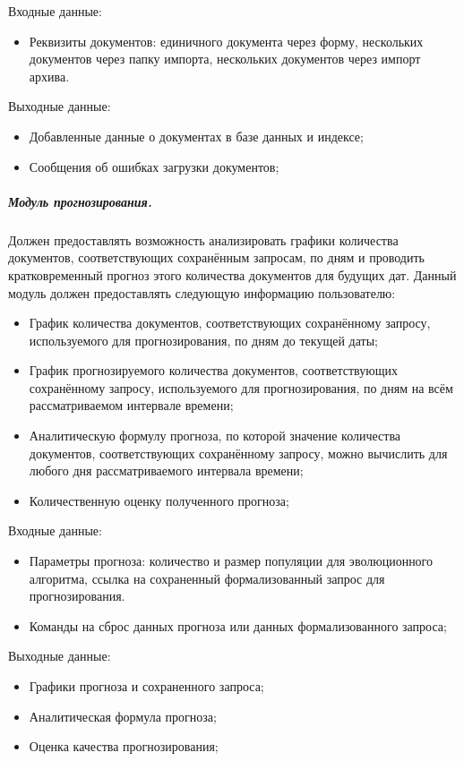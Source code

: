 Входные данные:
\begin{itemize}
\item Реквизиты документов: единичного документа через форму, нескольких документов через папку импорта, нескольких документов через импорт архива.
\end{itemize}

Выходные данные:
\begin{itemize}
\item Добавленные данные о документах в базе данных и индексе;
\item Сообщения об ошибках загрузки документов;
\end{itemize}

\subparagraph{Модуль прогнозирования.} \hfill

Должен предоставлять возможность анализировать графики количества документов, соответствующих сохранённым запросам, по дням и проводить кратковременный прогноз этого количества документов для будущих дат. Данный модуль должен предоставлять следующую информацию пользователю:
\begin{itemize}
\item График количества документов, соответствующих сохранённому запросу, используемого для прогнозирования, по дням до текущей даты;
\item График прогнозируемого количества документов, соответствующих сохранённому запросу, используемого для прогнозирования, по дням на всём рассматриваемом интервале времени;
\item Аналитическую формулу прогноза, по которой значение количества документов, соответствующих сохранённому запросу, можно вычислить для любого дня рассматриваемого интервала времени;
\item Количественную оценку полученного прогноза;
\end{itemize}

Входные данные:
\begin{itemize}
\item Параметры прогноза: количество и размер популяции для эволюционного алгоритма, ссылка на сохраненный формализованный запрос для прогнозирования.
\item Команды на сброс данных прогноза или данных формализованного запроса;
\end{itemize}

Выходные данные:
\begin{itemize}
\item Графики прогноза и сохраненного запроса;
\item Аналитическая формула прогноза;
\item Оценка качества прогнозирования;
\end{itemize}

